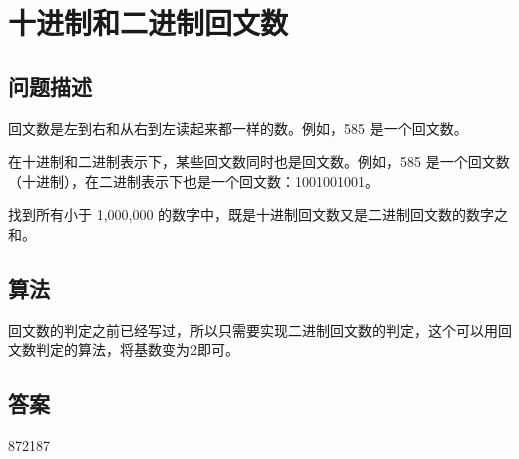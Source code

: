 \section{十进制和二进制回文数}\label{sec:problem36}
\subsection{问题描述}
\begin{tcolorbox}

回文数是左到右和从右到左读起来都一样的数。例如，585 是一个回文数。

在十进制和二进制表示下，某些回文数同时也是回文数。例如，585 是一个回文数（十进制），在二进制表示下也是一个回文数：1001001001。

找到所有小于 1,000,000 的数字中，既是十进制回文数又是二进制回文数的数字之和。
\end{tcolorbox}

\subsection{算法}
回文数的判定之前已经写过，所以只需要实现二进制回文数的判定，这个可以用回文数判定的算法，将基数变为2即可。


\subsection{答案}
872187
